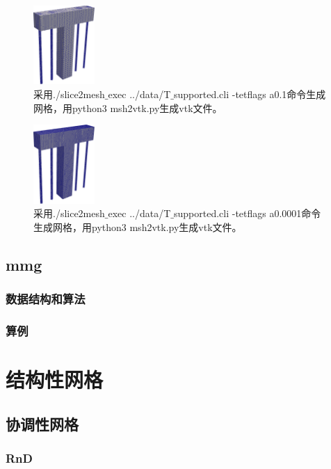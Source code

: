 \begin{figure}[!htbp]
  \centering
  \includegraphics[height=3cm]{fig/1/1.1.7.2:4.png}
  \caption{采用./slice2mesh$\_$exec ../data/T$\_$supported.cli -tetflags a0.1命令生成网格，用python3 msh2vtk.py生成vtk文件。}
  \label{fig:1-7}
\end{figure}

\begin{figure}[!htbp]
  \centering
  \includegraphics[height=3cm]{fig/1/1.1.7.2:5.png}
  \caption{采用./slice2mesh$\_$exec ../data/T$\_$supported.cli -tetflags a0.0001命令生成网格，用python3 msh2vtk.py生成vtk文件。}
  \label{fig:1-7}
\end{figure}

\subsection{mmg}

\subsubsection{数据结构和算法}

\subsubsection{算例}

\section{结构性网格}

\subsection{协调性网格}

\subsubsection{RnD}


